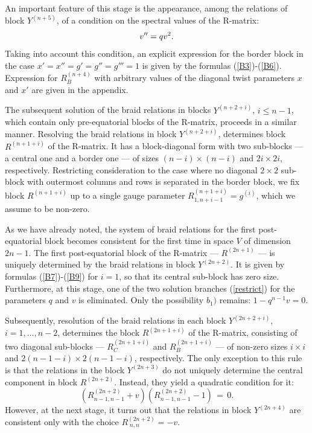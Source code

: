 \documentclass[11pt]{article}
\def\be{\begin{equation}}\def\ee{\end{equation}}
\begin{document}
An important feature of this stage is the appearance, among the relations of block $Y^{(n+5)}$, of a condition on the  spectral values of the R-matrix: 
\be
\lb{cond-spec}
v''=q v^2.
\ee
Taking into account this condition, an explicit expression for the border block in the case $x'=x''=g'=g''=g'''=1$ is given by the formulas (\ref{B3})-(\ref{B6}). Expression for 
$R_{B}^{(n+4)}$ 
with arbitrary values of the diagonal twist parameters  $x$ and $x'$  are given  in the appendix.

The subsequent solution of the braid relations in blocks  $Y^{(n+2+i)}$, $i\leq n-1$, which contain 
only pre-equatorial blocks of the R-matrix, proceeds in a similar manner. 
Resolving  the braid relations in block $Y^{(n+2+i)}$, 
determines block $R^{(n+1+i)}$ of the R-matrix.
It has a block-diagonal form with two sub-blocks ---
a central one and a border one --- of sizes $(n-i)\times(n-i)$ and $2i\times 2i$, respectively.
Restricting consideration to the case where no diagonal $2\times 2$ sub-block with outermost columns and rows is separated in the border block,
we fix block $R^{(n+1+i)}$ up to a single gauge parameter 
$R^{(n+1+i)}_{1, n+i-1}=g^{(i)}$, which we assume to be non-zero.\smallskip

As we have already noted, the system of braid relations for the first post-equatorial block becomes consistent for the first time in space $V$ of dimension $2n-1$. The first post-equatorial block of the R-matrix ---  $R^{(2n+1)}$ --- is uniquely determined by the braid relations in block 
$Y^{(2n+2)}$. It is given by formulas (\ref{B7})-(\ref{B9}) for $i=1$, so that its central sub-block has zero size.
Furthermore, at this stage, one of the two solution branches (\ref{restrict}) for the parameters $q$ and $v$ is eliminated.
Only the possibility $b_1)$ remains: $1-q^{n-1} v=0$.\smallskip

Subsequently, resolution of the braid relations in each block $Y^{(2n+2+i)}$, $i=1,\dots ,n-2$, determines the block $R^{(2n+1+i)}$ of the R-matrix, consisting of two diagonal sub-blocks --- $R_{C}^{(2n+1+i)}$ and $R_{B}^{(2n+1+i)}$ --- of non-zero sizes $i\times i$ and $2(n-1-i)\times2(n-1-i)$, respectively.
The only exception to this rule is that the relations in the block $Y^{(2n+3)}$ do not uniquely determine the central component %
in block $R^{(2n+2)}$. Instead, they yield a quadratic condition for it:
$$
\left(R^{(2n+2)}_{n-1,n-1}+v\right)\left(R^{(2n+2)}_{n-1,n-1}-1\right)\, =\, 0.
$$
However, at the next stage, it turns out that the relations in block $Y^{(2n+4)}$ are consistent only  with the choice $R^{(2n+2)}_{\;n,n}=-v$. 
\end{document}
